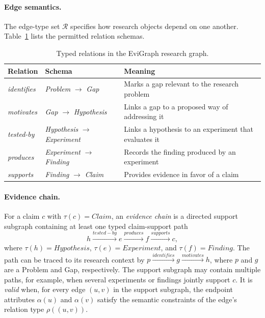 \documentclass[letterpaper]{article} %
\newtheorem{definition}{Definition}
\begin{document}
\paragraph{Edge semantics.}
The edge-type set $\mathcal{R}$ specifies how research objects depend on one
another. Table~\ref{tab:edge-types} lists the permitted relation schemas.

\begin{table}[t]
  \centering
  \small
  \begin{tabular}{@{}p{1.55cm}p{2.10cm}p{3.70cm}@{}}
    \toprule
    \textbf{Relation} & \textbf{Schema} & \textbf{Meaning} \\
    \midrule
    \textit{identifies} & \textit{Problem} $\rightarrow$ \textit{Gap} & Marks a gap relevant to the research problem \\
    \textit{motivates} & \textit{Gap} $\rightarrow$ \textit{Hypothesis} & Links a gap to a proposed way of addressing it \\
    \textit{tested-by} & \textit{Hypothesis} $\rightarrow$ \textit{Experiment} & Links a hypothesis to an experiment that evaluates it \\
    \textit{produces} & \textit{Experiment} $\rightarrow$ \textit{Finding} & Records the finding produced by an experiment \\
    \textit{supports} & \textit{Finding} $\rightarrow$ \textit{Claim} & Provides evidence in favor of a claim \\
    \bottomrule
  \end{tabular}
  \caption{Typed relations in the EviGraph research graph.}
  \label{tab:edge-types}
\end{table}

 \paragraph{Evidence chain.}
For a claim $c$ with $\tau(c)=Claim$, an \emph{evidence chain} is a
directed support subgraph containing at least one typed claim-support path
\[
h \xrightarrow{tested-by} e
  \xrightarrow{produces} f
  \xrightarrow{supports} c,
\]
where $\tau(h)=Hypothesis $, $\tau(e)=Experiment$, and
$\tau(f)=Finding$. The path can be traced to its research context by
$p\xrightarrow{identifies}g
\xrightarrow{motivates}h$, where $p$ and $g$ are a
Problem and Gap, respectively. The support subgraph may contain
multiple paths,  for example, when several experiments or findings jointly support $c$. It is
\emph{valid} when, for every edge $(u,v)$ in the support subgraph, the endpoint
attributes $\alpha(u)$ and $\alpha(v)$ satisfy the semantic constraints of the
edge's relation type $\rho((u,v))$.
\end{document}
